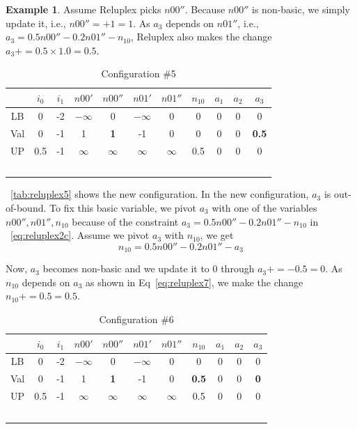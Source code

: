 \documentclass[oneside,11pt,dvipsnames]{book}
\numberwithin{equation}{section}
\theoremstyle{definition}
\newtheorem{example}{Example}[section]
\theoremstyle{remark}
\begin{document}
\begin{example}
Assume Reluplex picks $n00''$. Because $n00''$ is non-basic, we simply update it, i.e.,  $n00'' = \text{+} 1 = 1$.  As $a_3$ depends on $n01''$, i.e., $ a_3 = 0.5n00'' -0.2 n01'' - n_{10}$, Reluplex also makes the change $a_3+= 0.5\times 1.0=0.5$.



\begin{table}[h]
    \centering
\begin{tabular}{ccccccccccc}
     & $i_0$ & $i_1$ & $n00'$ & $n00''$ & $n01'$ & $n01''$ & $n_{10}$ &$a_1$&$a_2$&$a_3$ \\
    \midrule
    LB & 0 & -2 & $-\infty$&0&$-\infty$& 0 & 0 & 0 & 0 &0\\
    Val& 0 & -1 & 1 & \textbf{1} & -1 & 0 & 0 & 0 & 0 & \textbf{0.5}\\
    UP & 0.5 & -1 &$\infty$&$\infty$&$\infty$&$\infty$&0.5& 0 & 0 & 0\\\
\end{tabular}
\caption{Configuration \#5}\label{tab:reluplex5}
\end{table}

~\autoref{tab:reluplex5} shows the new configuration.
In the new configuration, $a_3$ is out-of-bound. To fix this basic variable, we pivot $a_3$ with one of the variables $n00'', n01'', n_{10}$ because of the constraint $a_3 = 0.5n00'' -0.2 n01'' - n_{10}$ in ~\autoref{eq:reluplex2c}. Assume we pivot $a_3$ with $n_{10}$, we get
\begin{equation}\label{eq:reluplex7}
  n_{10} = 0.5n00'' -0.2 n01'' - a_3
\end{equation}

Now, $a_3$ becomes non-basic and we update it to 0 through $a_3+=-0.5=0$.  As $n_{10}$ depends on $a_3$ as shown in Eq~\ref{eq:reluplex7}, we make the change $n_{10} += 0.5=0.5$.

\begin{table}[h]
    \centering
\begin{tabular}{ccccccccccc}
     & $i_0$ & $i_1$ & $n00'$ & $n00''$ & $n01'$ & $n01''$ & $n_{10}$ &$a_1$&$a_2$&$a_3$ \\
    \midrule
    LB & 0 & -2 & $-\infty$&0&$-\infty$& 0 & 0 & 0 & 0 &0\\
    Val& 0 & -1 & 1 & \textbf{1} & -1 & 0 & \textbf{0.5} & 0 & 0 & \textbf{0}\\
    UP & 0.5 & -1 &$\infty$&$\infty$&$\infty$&$\infty$&0.5& 0 & 0 & 0\\\
\end{tabular}
\caption{Configuration \#6}\label{tab:reluplex6}
\end{table}


\end{example}
\end{document}
